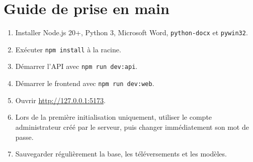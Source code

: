 \documentclass[12pt,a4paper,oneside]{report}
\newcommand{\code}[1]{\texttt{#1}}
\begin{document}
\chapter{Guide de prise en main}
\begin{enumerate}
  \item Installer Node.js 20+, Python 3, Microsoft Word, \code{python-docx} et \code{pywin32}.
  \item Exécuter \code{npm install} à la racine.
  \item Démarrer l'API avec \code{npm run dev:api}.
  \item Démarrer le frontend avec \code{npm run dev:web}.
  \item Ouvrir \url{http://127.0.0.1:5173}.
  \item Lors de la première initialisation uniquement, utiliser le compte administrateur créé par le serveur, puis changer immédiatement son mot de passe.
  \item Sauvegarder régulièrement la base, les téléversements et les modèles.
\end{enumerate}
\end{document}
